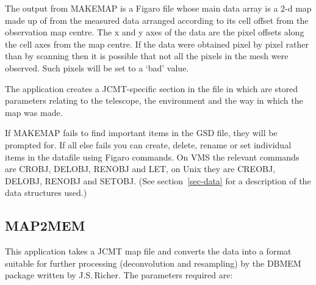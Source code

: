 \goodbreak

The output from MAKEMAP is a Figaro file whose main data array is a
2-d map made up of from the measured data arranged according to its
cell offset from the observation map centre. The x and y axes of the
data are the pixel offsets along the cell axes from the map centre. If
the data were obtained pixel by pixel rather than by scanning then it
is possible that not all the pixels in the mesh were observed. Such
pixels will be set to a `bad' value.

The application creates a JCMT-specific section in the file in which
are stored parameters relating to the telescope, the environment and
the way in which the map was made. 

If MAKEMAP fails to find important items in the GSD file, they will be 
prompted for. If all else fails you can create, delete, rename or set
individual items in the datafile using Figaro commands.
On VMS the relevant commands are CROBJ, DELOBJ, RENOBJ and LET, on Unix
they are CREOBJ, DELOBJ, RENOBJ and SETOBJ.
(See section~\ref{sec-data} for a description
of the data structures used.)


\goodbreak

\subsection {MAP2MEM}

This application takes a JCMT map file and converts the data into a
format suitable for further processing (deconvolution and resampling)
by the  DBMEM package written by J.S.\,Richer. The parameters required
are:

\goodbreak

